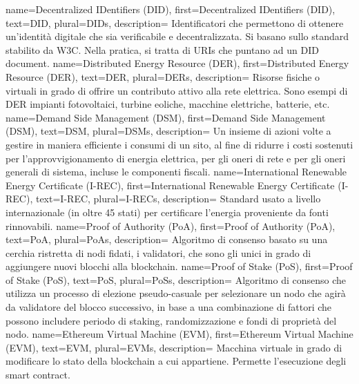 {
    name={Decentralized IDentifiers (DID)},
    first={Decentralized IDentifiers (DID)},
    text={DID},
    plural={DIDs},
    description={
            Identificatori che permettono di ottenere un'identità digitale che sia verificabile e decentralizzata.
            Si basano sullo standard stabilito da W3C.
            Nella pratica, si tratta di URIs che puntano ad un DID document.
        }
}
{
    name={Distributed Energy Resource (DER)},
    first={Distributed Energy Resource (DER)},
    text={DER},
    plural={DERs},
    description={
            Risorse fisiche o virtuali in grado di offrire un contributo attivo alla rete elettrica.
            Sono esempi di DER impianti fotovoltaici, turbine eoliche, macchine elettriche, batterie, etc.
        }
}
{
    name={Demand Side Management (DSM)},
    first={Demand Side Management (DSM)},
    text={DSM},
    plural={DSMs},
    description={
            Un insieme di azioni volte a gestire in maniera efficiente i consumi di un sito,
            al fine di ridurre i costi sostenuti per l’approvvigionamento di energia elettrica,
            per gli oneri di rete e per gli oneri generali di sistema, incluse le componenti fiscali.
        }
}
{
    name={International Renewable Energy Certificate (I-REC)},
    first={International Renewable Energy Certificate (I-REC)},
    text={I-REC},
    plural={I-RECs},
    description={
            Standard usato a livello internazionale (in oltre 45 stati) per certificare l'energia proveniente da fonti rinnovabili.
        }
}
{
    name={Proof of Authority (PoA)},
    first={Proof of Authority (PoA)},
    text={PoA},
    plural={PoAs},
    description={
            Algoritmo di consenso basato su una cerchia ristretta di nodi fidati, i validatori,
            che sono gli unici in grado di aggiungere nuovi blocchi alla blockchain.
        }
}
{
    name={Proof of Stake (PoS)},
    first={Proof of Stake (PoS)},
    text={PoS},
    plural={PoSs},
    description={
            Algoritmo di consenso che utilizza un processo di elezione pseudo-casuale per selezionare un nodo che agirà da validatore del blocco successivo,
            in base a una combinazione di fattori che possono includere periodo di staking, randomizzazione e fondi di proprietà del nodo.
        }
}
{
    name={Ethereum Virtual Machine (EVM)},
    first={Ethereum Virtual Machine (EVM)},
    text={EVM},
    plural={EVMs},
    description={
            Macchina virtuale in grado di modificare lo stato della blockchain a cui appartiene.
            Permette l'esecuzione degli smart contract.
        }
}

